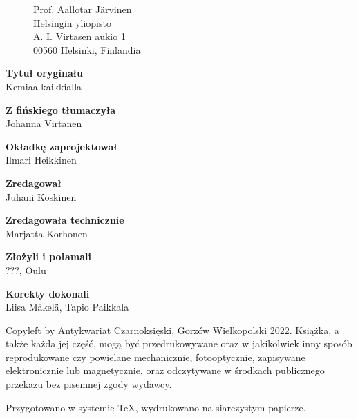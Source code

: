 

\thispagestyle{empty}
\begin{figure}[H]
\begin{minipage}[b]{.48\linewidth}
{\noindent Prof. Aallotar Järvinen\\
Helsingin yliopisto\\
A. I. Virtasen aukio 1\\
00560 Helsinki, Finlandia}
\end{minipage}
\end{figure}

{\noindent \textbf{Tytuł oryginału}\\Kemiaa kaikkialla}
\vspace{5mm}

{\noindent \textbf{Z fińskiego tłumaczyła}\\Johanna Virtanen} 
\vspace{5mm}

{\noindent \textbf{Okładkę zaprojektował}\\Ilmari Heikkinen}
\vspace{5mm}

{\noindent \textbf{Zredagował}\\Juhani Koskinen}
\vspace{5mm}

{\noindent \textbf{Zredagowała technicznie}\\Marjatta Korhonen}
\vspace{5mm}

{\noindent \textbf{Złożyli i połamali}\\???, Oulu}
\vspace{5mm}

{\noindent \textbf{Korekty dokonali}\\Liisa Mäkelä, Tapio Paikkala}

\vfill

{\noindent Copyleft by Antykwariat Czarnoksięski, Gorzów Wielkopolski 2022.
Książka, a także każda jej część, mogą być przedrukowywane oraz w jakikolwiek inny sposób reprodukowane czy powielane mechanicznie, fotooptycznie, zapisywane elektronicznie lub magnetycznie, oraz odczytywane w środkach publicznego przekazu bez pisemnej zgody wydawcy.}

\vspace{5mm}

{\noindent Przygotowano w systemie \TeX, wydrukowano na siarczystym papierze.}


